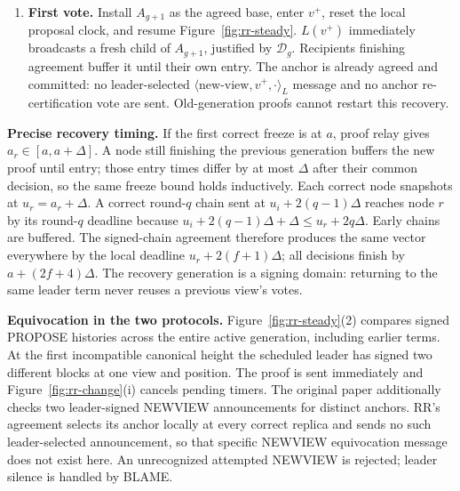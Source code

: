 \documentclass[10pt,a4paper]{article}
\newcommand{\RR}[1]{{\color{red!70!black}#1}}
\newcommand{\decide}{\mathcal D}
\begin{document}
\begin{minipage}{\linewidth}
\begin{mdframed}[linewidth=.65pt,innertopmargin=5pt,innerbottommargin=5pt]
\begin{enumerate}[label=\roman*),itemsep=3pt]
\item \textbf{First vote.} \RR{Install $A_{g+1}$ as the agreed base,
enter $v^+$, reset the local proposal clock, and resume Figure~\ref{fig:rr-steady}.
$L(v^+)$ immediately broadcasts a fresh child of $A_{g+1}$, justified by
$\decide_g$. Recipients finishing agreement buffer it until their own
entry. The anchor is already agreed and committed: no leader-selected
$\langle\mathrm{new\text{-}view},v^+,\cdot\rangle_L$ message and no anchor
re-certification vote are sent. Old-generation proofs cannot restart this
recovery.}
\end{enumerate}
\end{mdframed}
\label{fig:rr-change}
\end{minipage}

\medskip
\textbf{Precise recovery timing.} If the first correct freeze is at $a$,
proof relay gives $a_r\in[a,a+\Delta]$. A node still finishing the
previous generation buffers the new proof until entry; those entry times
differ by at most $\Delta$ after their common decision, so the same freeze
bound holds inductively. Each correct node snapshots at
$u_r=a_r+\Delta$. A correct round-$q$ chain sent at
$u_i+2(q-1)\Delta$ reaches node $r$ by its round-$q$ deadline because
$u_i+2(q-1)\Delta+\Delta\leq u_r+2q\Delta$.
Early chains are buffered. The signed-chain agreement therefore produces
the same vector everywhere by the local deadline
$u_r+2(f+1)\Delta$; all decisions finish by $a+(2f+4)\Delta$.
\RR{The recovery generation is a signing domain: returning to the same
leader term never reuses a previous view's votes.}

\textbf{Equivocation in the two protocols.} Figure~\ref{fig:rr-steady}(2)
compares signed PROPOSE histories across the entire active generation,
including earlier terms. At the first incompatible canonical height the
scheduled leader has signed two different blocks at one view and position.
The proof is sent immediately and Figure~\ref{fig:rr-change}(i) cancels
pending timers. \RR{The original paper additionally checks two
leader-signed NEWVIEW announcements for distinct anchors. RR's agreement
selects its anchor locally at every correct replica and sends no such
leader-selected announcement, so that specific NEWVIEW equivocation message
does not exist here. An unrecognized attempted NEWVIEW is rejected; leader
silence is handled by BLAME.}
\end{document}
